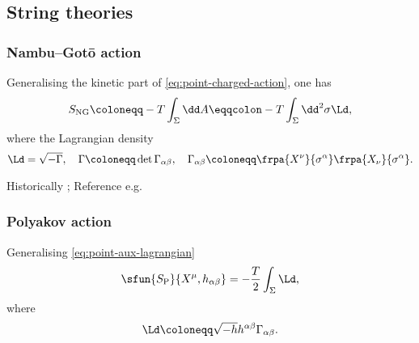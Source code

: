 \documentclass[a4paper,11pt]{article}
\begin{document}




\subsection{String theories}

\subsubsection*{Nambu--Gotō action}

Generalising the kinetic part of \eqref{eq:point-charged-action}, one has
\begin{equation}
S_\text{NG} \coloneqq -T \int_\Sigma \dd A
\eqqcolon -T \int_\Sigma\dd^2\sigma \Ld,
\end{equation}
where the Lagrangian density
\begin{equation}
\Ld = \sqrt{-\Gamma},\quad
\Gamma \coloneqq \det \Gamma_{\alpha\beta},\quad
\Gamma_{\alpha\beta} \coloneqq \frpa{X^\nu}{\sigma^\alpha} 
\frpa{X_\nu}{\sigma^\alpha}.
\end{equation}


Historically \cite{Nambu1970,Goto1971}; Reference e.g.\ 
\cite{Blumenhagen2013}
\cite[sec.\ 3.2]{Kiefer2012}

\subsubsection*{Polyakov action}

Generalising \eqref{eq:point-aux-lagrangian}
\begin{equation}
\sfun{S_\text{P}}{X^\mu, h_{\alpha\beta}} = -\frac{T}{2}\int_\Sigma \Ld,
\end{equation}
where
\begin{equation}
\Ld \coloneqq \sqrt{-h} h^{\alpha\beta}\Gamma_{\alpha\beta}.
\end{equation}
\end{document}
